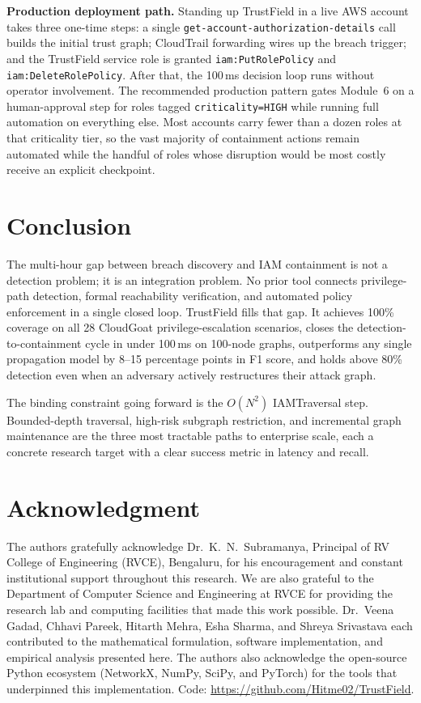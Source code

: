 \documentclass[conference,a4paper]{IEEEtran}
\begin{document}
\textbf{Production deployment path.}
Standing up TrustField in a live AWS account takes three one-time steps:
a single \texttt{get-account-authorization-details} call builds the
initial trust graph; CloudTrail forwarding wires up the breach trigger;
and the TrustField service role is granted \texttt{iam:PutRolePolicy}
and \texttt{iam:DeleteRolePolicy}.
After that, the 100\,ms decision loop runs without operator involvement.
The recommended production pattern gates Module~6 on a human-approval
step for roles tagged \texttt{criticality=HIGH} while running full
automation on everything else.
Most accounts carry fewer than a dozen roles at that criticality tier,
so the vast majority of containment actions remain automated while the
handful of roles whose disruption would be most costly receive an
explicit checkpoint.

\section{Conclusion}

The multi-hour gap between breach discovery and IAM containment is not a
detection problem; it is an integration problem. No prior tool connects
privilege-path detection, formal reachability verification, and automated
policy enforcement in a single closed loop. TrustField fills that gap.
It achieves 100\% coverage on all 28 CloudGoat privilege-escalation
scenarios, closes the detection-to-containment cycle in under 100\,ms on
100-node graphs, outperforms any single propagation model by 8--15
percentage points in F1 score, and holds above 80\% detection even when
an adversary actively restructures their attack graph.

The binding constraint going forward is the $O(N^2)$ IAMTraversal step.
Bounded-depth traversal, high-risk subgraph restriction, and incremental
graph maintenance are the three most tractable paths to enterprise scale,
each a concrete research target with a clear success metric in latency
and recall.

\section*{Acknowledgment}
The authors gratefully acknowledge Dr.\ K.\ N.\ Subramanya,
Principal of RV College of Engineering (RVCE), Bengaluru, for his
encouragement and constant institutional support throughout this
research. We are also grateful to the Department of Computer Science
and Engineering at RVCE for providing the research lab and computing
facilities that made this work possible.
Dr.\ Veena Gadad, Chhavi Pareek, Hitarth Mehra, Esha Sharma, and
Shreya Srivastava each contributed to the mathematical formulation,
software implementation, and empirical analysis presented here.
The authors also acknowledge the open-source Python ecosystem
(NetworkX, NumPy, SciPy, and PyTorch) for the tools that underpinned
this implementation. Code: \url{https://github.com/Hitme02/TrustField}.
\end{document}
